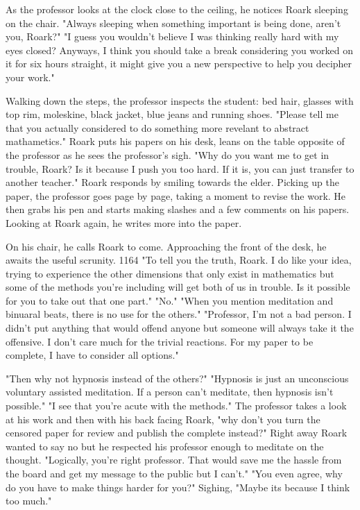 		As the professor looks at the clock close to the ceiling, he notices Roark sleeping on the chair. "Always sleeping when something
	important is being done, aren't you, Roark?" "I guess you wouldn't believe I was thinking really hard with my eyes closed? Anyways, I think
	you should take a break considering you worked on it for six hours straight, it might give you a new perspective to help you decipher your
	work." 

		Walking down the steps, the professor inspects the student: bed hair, glasses with top rim, moleskine, black jacket, blue jeans and
	running shoes. "Please tell me that you actually considered to do something more revelant to abstract mathametics." Roark puts his papers on
	his desk, leans on the table opposite of the professor as he sees the professor's sigh. "Why do you want me to get in trouble, Roark? Is
	it because I push you too hard. If it is, you can just transfer to another teacher." Roark responds by smiling towards the elder. Picking up
	the paper, the professor goes page by page, taking a moment to revise the work. He then grabs his pen and starts making slashes and a few
	comments on his papers. Looking at Roark again, he writes more into the paper.

		On his chair, he calls Roark to come. Approaching the front of the desk, he awaits the useful scrunity. {1164} "To tell you the
	truth, Roark. I do like your idea, trying to experience the other dimensions that only exist in mathematics but some of the methods you're
	including will get both of us in trouble. Is it possible for you to take out that one part." "No." "When you mention meditation and binuaral
	beats, there is no use for the others." "Professor, I'm not a bad person. I didn't put anything that would offend anyone but someone will
	always take it the offensive. I don't care much for the trivial reactions. For my paper to be complete, I have to consider all options."

		"Then why not hypnosis instead of the others?" "Hypnosis is just an unconscious voluntary assisted meditation. If a person can't
	meditate, then hypnosis isn't possible." "I see that you're acute with the methods." The professor takes a look at his work and then with
	his back facing Roark, "why don't you turn the censored paper for review and publish the complete instead?" Right away Roark wanted to say no
	but he respected his professor enough to meditate on the thought. "Logically, you're right professor. That would save me the hassle from
	the board and get my message to the public but I can't." "You even agree, why do you have to make things harder for you?" Sighing, "Maybe its
	because I think too much."

